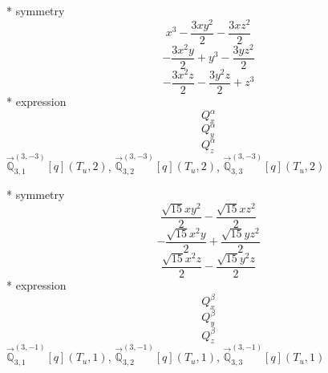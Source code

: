 \documentclass[fleqn,8pt]{jsarticle}
\begin{document}
\noindent\quad ** symmetry
\begin{dmath*}
x^{3} - \frac{3 x y^{2}}{2} - \frac{3 x z^{2}}{2}
\end{dmath*}
\begin{dmath*}
- \frac{3 x^{2} y}{2} + y^{3} - \frac{3 y z^{2}}{2}
\end{dmath*}
\begin{dmath*}
- \frac{3 x^{2} z}{2} - \frac{3 y^{2} z}{2} + z^{3}
\end{dmath*}
\noindent\quad ** expression
\begin{dmath*}
Q_{x}^{\alpha}
\end{dmath*}
\begin{dmath*}
Q_{y}^{\alpha}
\end{dmath*}
\begin{dmath*}
Q_{z}^{\alpha}
\end{dmath*}
\noindent\quad $\vec{\mathbb{Q}}_{3,1}^{(3,-3)}[q](T_{u},2)$, $\vec{\mathbb{Q}}_{3,2}^{(3,-3)}[q](T_{u},2)$, $\vec{\mathbb{Q}}_{3,3}^{(3,-3)}[q](T_{u},2)$

\noindent\quad ** symmetry
\begin{dmath*}
\frac{\sqrt{15} x y^{2}}{2} - \frac{\sqrt{15} x z^{2}}{2}
\end{dmath*}
\begin{dmath*}
- \frac{\sqrt{15} x^{2} y}{2} + \frac{\sqrt{15} y z^{2}}{2}
\end{dmath*}
\begin{dmath*}
\frac{\sqrt{15} x^{2} z}{2} - \frac{\sqrt{15} y^{2} z}{2}
\end{dmath*}
\noindent\quad ** expression
\begin{dmath*}
Q_{x}^{\beta}
\end{dmath*}
\begin{dmath*}
Q_{y}^{\beta}
\end{dmath*}
\begin{dmath*}
Q_{z}^{\beta}
\end{dmath*}
\noindent\quad $\vec{\mathbb{Q}}_{3,1}^{(3,-1)}[q](T_{u},1)$, $\vec{\mathbb{Q}}_{3,2}^{(3,-1)}[q](T_{u},1)$, $\vec{\mathbb{Q}}_{3,3}^{(3,-1)}[q](T_{u},1)$
\end{document}
